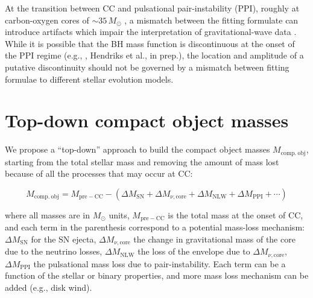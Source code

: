 \documentclass[twocolumn]{aastex63}
\newcommand{\todo}[1]{{\large $\blacksquare$~\textbf{\color{red}[#1]}}~$\blacksquare$}
\begin{document}
At the transition between CC and pulsational
pair-instability (PPI), roughly at carbon-oxygen cores of
$\sim{}35\,M_\odot$ \citep[][]{woosley:17, marchant:19, renzo:20csm,
  costa:21}, a mismatch between the fitting formulate can introduce
artifacts which impair the interpretation of gravitational-wave data
\citep[see, e.g., the corresponding feature in Fig.~5
of][]{vanson:21}. While it is possible that the BH mass function is
discontinuous at the onset of the PPI regime (e.g.,
\citealt{renzo:20conv,costa:21}, Hendriks et al., in prep.), the
location and amplitude of a putative discontinuity should not be
governed by a mismatch between fitting formulae to different stellar
evolution models.

\section{Top-down compact object masses}

We propose a ``top-down'' approach to build the compact object masses
$M_\mathrm{comp.\ obj}$, starting from the total stellar mass and
removing the amount of mass lost because of all the processes that may
occur at CC:


\begin{widetext}
  \begin{equation}
    \label{eq:mass}
    M_\mathrm{comp.\ obj} = M_\mathrm{pre-CC} - \left(\Delta M_\mathrm{SN} + \Delta M_{\nu, \mathrm{core}} + \Delta M_\mathrm{NLW} + \Delta M_\mathrm{PPI} + \cdots \right)
  \end{equation}
\end{widetext}

where all masses are in $M_\odot$ units, $M_\mathrm{pre-CC}$ is the
total mass at the onset of CC, and each term in the
parenthesis correspond to a potential mass-loss mechanism:
$\Delta M_\mathrm{SN}$ for the SN ejecta,
$\Delta M_{\nu, \mathrm{core}}$ the change in gravitational mass of
the core due to the neutrino losses, $\Delta M_\mathrm{NLW}$ the
\cite{nadezhin:80, lovegrove:13} loss of the envelope due to
$\Delta M_{\nu, \mathrm{core}}$, $\Delta M_\mathrm{PPI}$ the
pulsational mass loss due to pair-instability. Each term can be a
function of the stellar or binary properties, and more mass loss
mechanism can be added (e.g., disk wind).
\end{document}
